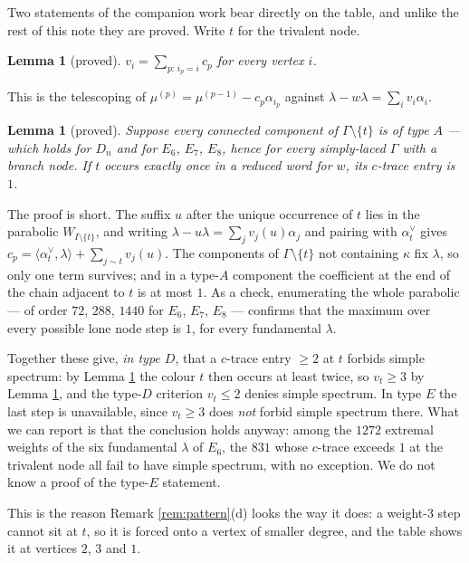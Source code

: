 \documentclass[reqno]{amsart}
\theoremstyle{plain}
\newtheorem{lemma}[theorem]{Lemma}
\theoremstyle{definition}
\newcommand{\la}{\lambda}
\newcommand{\al}{\alpha}
\newcommand{\ka}{\kappa}
\begin{document}
Two statements of the companion work bear directly on the table, and unlike the
rest of this note they are proved.  Write $t$ for the trivalent node.

\begin{lemma}[proved]\label{lem:vsum}
$v_i=\sum_{p:\,i_p=i}c_p$ for every vertex $i$.
\end{lemma}

This is the telescoping of $\mu^{(p)}=\mu^{(p-1)}-c_p\al_{i_p}$ against
$\la-w\la=\sum_iv_i\al_i$.

\begin{lemma}[proved]\label{lem:lone}
Suppose every connected component of $\Gamma\setminus\{t\}$ is of type $A$ ---
which holds for $D_n$ and for $E_6$, $E_7$, $E_8$, hence for every simply-laced
$\Gamma$ with a branch node.  If $t$ occurs exactly once in a reduced word for
$w$, its $c$-trace entry is $1$.
\end{lemma}

The proof is short.  The suffix $u$ after the unique occurrence of $t$ lies in
the parabolic $W_{I\setminus\{t\}}$, and writing
$\la-u\la=\sum_jv_j(u)\al_j$ and pairing with $\al_t^\vee$ gives
$c_p=\langle\al_t^\vee,\la\rangle+\sum_{j\sim t}v_j(u)$.  The components of
$\Gamma\setminus\{t\}$ not containing $\ka$ fix $\la$, so only one term
survives; and in a type-$A$ component the coefficient at the end of the chain
adjacent to $t$ is at most $1$.  As a check, enumerating the whole parabolic
--- of order $72$, $288$, $1440$ for $E_6$, $E_7$, $E_8$ --- confirms that the
maximum over every possible lone node step is $1$, for every fundamental
$\la$.

Together these give, \emph{in type $D$}, that a $c$-trace entry $\ge2$ at $t$
forbids simple spectrum: by Lemma \ref{lem:lone} the colour $t$ then occurs at
least twice, so $v_t\ge3$ by Lemma \ref{lem:vsum}, and the type-$D$ criterion
$v_t\le2$ denies simple spectrum.  In type $E$ the last step is unavailable,
since $v_t\ge3$ does \emph{not} forbid simple spectrum there.  What we can
report is that the conclusion holds anyway: among the $1272$ extremal weights
of the six fundamental $\la$ of $E_6$, the $831$ whose $c$-trace exceeds $1$
at the trivalent node all fail to have simple spectrum, with no exception.  We
do not know a proof of the type-$E$ statement.

This is the reason Remark \ref{rem:pattern}(d) looks the way it does: a
weight-$3$ step cannot sit at $t$, so it is forced onto a vertex of smaller
degree, and the table shows it at vertices $2$, $3$ and $1$.
\end{document}
